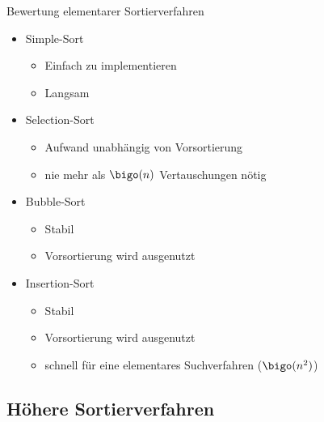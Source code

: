 \begin{bonus}{Bewertung elementarer Sortierverfahren}
    \begin{itemize}
        \item Simple-Sort
              \begin{itemize}
                  \item Einfach zu implementieren
                  \item Langsam
              \end{itemize}
        \item Selection-Sort
              \begin{itemize}
                  \item Aufwand unabhängig von Vorsortierung
                  \item nie mehr als $\bigo(n)$ Vertauschungen nötig
              \end{itemize}
        \item Bubble-Sort
              \begin{itemize}
                  \item Stabil
                  \item Vorsortierung wird ausgenutzt
              \end{itemize}
        \item Insertion-Sort
              \begin{itemize}
                  \item Stabil
                  \item Vorsortierung wird ausgenutzt
                  \item schnell für eine elementares Suchverfahren ($\bigo(n^2)$)
              \end{itemize}
    \end{itemize}
\end{bonus}

\subsection{Höhere Sortierverfahren}

